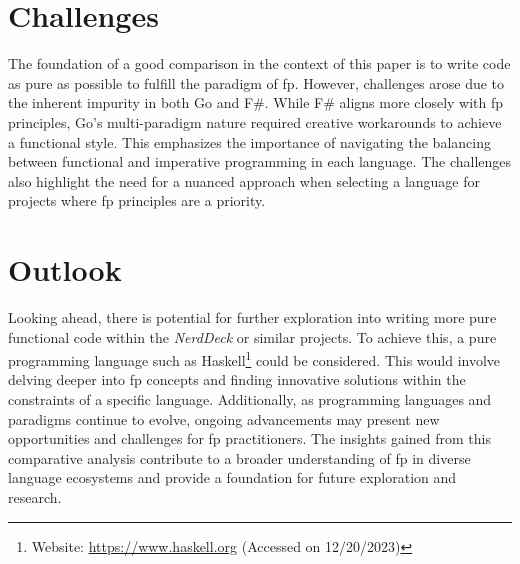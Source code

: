     \section{Challenges}\label{sec:challenges}
    The foundation of a good comparison in the context of this paper is to write code as pure as possible to fulfill the paradigm of \ac{fp}. However, challenges arose due to the inherent impurity in both Go and F\#. While F\# aligns more closely with \ac{fp} principles, Go's multi-paradigm nature required creative workarounds to achieve a functional style. This emphasizes the importance of navigating the balancing between functional and imperative programming in each language. The challenges also highlight the need for a nuanced approach when selecting a language for projects where \ac{fp} principles are a priority.        

    \section{Outlook}\label{sec:outlook}
    Looking ahead, there is potential for further exploration into writing more pure functional code within the \textit{NerdDeck} or similar projects. To achieve this, a pure programming language such as Haskell\footnote{Website: \url{https://www.haskell.org} (Accessed on 12/20/2023)} could be considered. This would involve delving deeper into \ac{fp} concepts and finding innovative solutions within the constraints of a specific language. Additionally, as programming languages and paradigms continue to evolve, ongoing advancements may present new opportunities and challenges for \ac{fp} practitioners. The insights gained from this comparative analysis contribute to a broader understanding of \ac{fp} in diverse language ecosystems and provide a foundation for future exploration and research.
